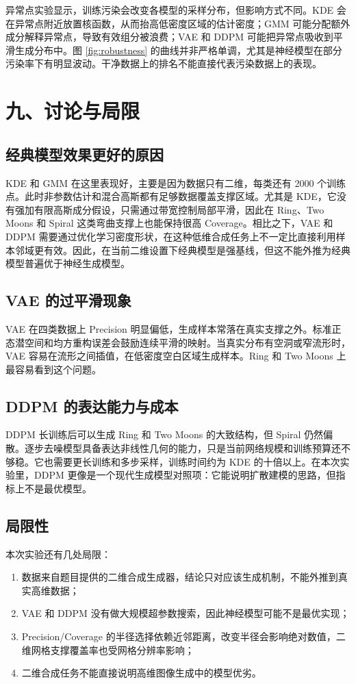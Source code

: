 \documentclass[a4paper,11pt]{article}
\newcommand{\templsection}[2]{%
  \setcounter{section}{#1}%
  \setcounter{subsection}{0}%
  \section*{#2}%
  \addcontentsline{toc}{section}{#2}%
}
\begin{document}
异常点实验显示，训练污染会改变各模型的采样分布，但影响方式不同。KDE 会在异常点附近放置核函数，从而抬高低密度区域的估计密度；GMM 可能分配额外成分解释异常点，导致有效组分被浪费；VAE 和 DDPM 可能把异常点吸收到平滑生成分布中。图 \ref{fig:robustness} 的曲线并非严格单调，尤其是神经模型在部分污染率下有明显波动。干净数据上的排名不能直接代表污染数据上的表现。

\templsection{9}{九、讨论与局限}

\subsection{经典模型效果更好的原因}

KDE 和 GMM 在这里表现好，主要是因为数据只有二维，每类还有 2000 个训练点。此时非参数估计和混合高斯都有足够数据覆盖支撑区域。尤其是 KDE，它没有强加有限高斯成分假设，只需通过带宽控制局部平滑，因此在 Ring、Two Moons 和 Spiral 这类弯曲支撑上也能保持很高 Coverage。相比之下，VAE 和 DDPM 需要通过优化学习密度形状，在这种低维合成任务上不一定比直接利用样本邻域更有效。因此，在当前二维设置下经典模型是强基线，但这不能外推为经典模型普遍优于神经生成模型。

\subsection{VAE 的过平滑现象}

VAE 在四类数据上 Precision 明显偏低，生成样本常落在真实支撑之外。标准正态潜空间和均方重构误差会鼓励连续平滑的映射。当真实分布有空洞或窄流形时，VAE 容易在流形之间插值，在低密度空白区域生成样本。Ring 和 Two Moons 上最容易看到这个问题。

\subsection{DDPM 的表达能力与成本}

DDPM 长训练后可以生成 Ring 和 Two Moons 的大致结构，但 Spiral 仍然偏散。逐步去噪模型具备表达非线性几何的能力，只是当前网络规模和训练预算还不够稳。它也需要更长训练和多步采样，训练时间约为 KDE 的十倍以上。在本次实验里，DDPM 更像是一个现代生成模型对照项：它能说明扩散建模的思路，但指标上不是最优模型。

\subsection{局限性}

本次实验还有几处局限：
\begin{enumerate}
    \item 数据来自题目提供的二维合成生成器，结论只对应该生成机制，不能外推到真实高维数据；
    \item VAE 和 DDPM 没有做大规模超参数搜索，因此神经模型可能不是最优实现；
    \item Precision/Coverage 的半径选择依赖近邻距离，改变半径会影响绝对数值，二维网格支撑覆盖率也受网格分辨率影响；
    \item 二维合成任务不能直接说明高维图像生成中的模型优劣。
\end{enumerate}
\end{document}
